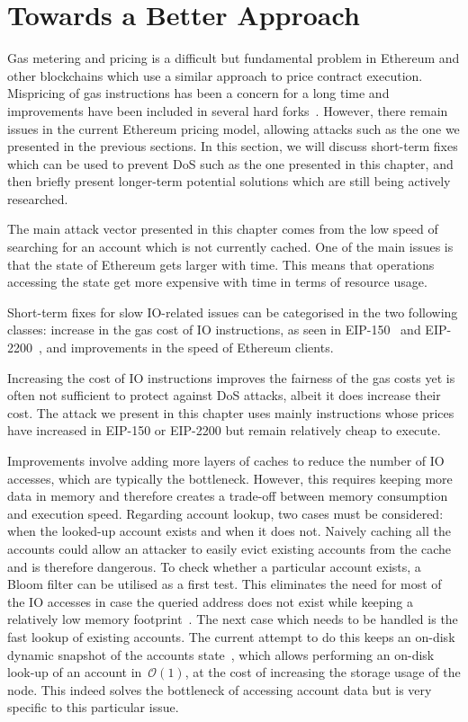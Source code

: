 \section{Towards a Better Approach}
\label{sec:3:design}

Gas metering and pricing is a difficult but fundamental problem in Ethereum and other blockchains which use a similar approach to price contract execution. Mispricing of gas instructions has been a concern for a long time and improvements have been included in several hard forks~\cite{erc150,eip2200}. However, there remain issues in the current Ethereum pricing model, allowing attacks such as the one we presented in the previous sections. In this section, we will discuss short-term fixes which can be used to prevent DoS such as the one presented in this chapter, and then briefly present longer-term potential solutions which are still being actively researched. 

The main attack vector presented in this chapter comes from the low speed of searching for an account which is not currently cached. One of the main issues is that the state of Ethereum gets larger with time. This means that operations accessing the state get more expensive with time in terms of resource usage.

Short-term fixes for slow IO-related issues can be categorised in the two following classes: increase in the gas cost of IO instructions, as seen in EIP-150~\cite{erc150} and EIP-2200~\cite{eip2200}, and improvements in the speed of Ethereum clients.

Increasing the cost of IO instructions improves the fairness of the gas costs yet is often not sufficient to protect against DoS attacks, albeit it does increase their cost. The attack we present in this chapter uses mainly instructions whose prices have increased in EIP-150 or EIP-2200 but remain relatively cheap to execute.

Improvements involve adding more layers of caches to reduce the number of IO accesses, which are typically the bottleneck. However, this requires keeping more data in memory and therefore creates a trade-off between memory consumption and execution speed. Regarding account lookup, two cases must be considered: when the looked-up account exists and when it does not. Naively caching all the accounts could allow an attacker to easily evict existing accounts from the cache and is therefore dangerous. To check whether a particular account exists, a Bloom filter can be utilised as a first test. This eliminates the need for most of the IO accesses in case the queried address does not exist while keeping a relatively low memory footprint~\cite{mitzenmacher2002compressed}. The next case which needs to be handled is the fast lookup of existing accounts. The current attempt to do this keeps an on-disk dynamic snapshot of the accounts state~\cite{dynamic-trie-snapshot-pr}, which allows performing an on-disk look-up of an account in~$\mathcal{O}(1)$, at the cost of increasing the storage usage of the node. This indeed solves the bottleneck of accessing account data but is very specific to this particular issue.

